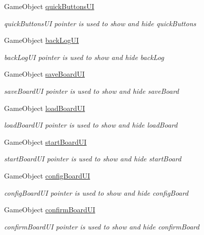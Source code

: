 \begin{DoxyCompactItemize}
Game\+Object \hyperlink{classdoki_unity_1_1_world_control_a75860dbad7622880a7423f9591c100eb}{quick\+Buttons\+UI}
\begin{DoxyCompactList}\small\item\em quick\+Buttons\+UI pointer is used to show and hide quick\+Buttons \end{DoxyCompactList}\item 
Game\+Object \hyperlink{classdoki_unity_1_1_world_control_a0a45da5cc8aca07edcb84b2b4efdb405}{back\+Log\+UI}
\begin{DoxyCompactList}\small\item\em back\+Log\+UI pointer is used to show and hide back\+Log \end{DoxyCompactList}\item 
Game\+Object \hyperlink{classdoki_unity_1_1_world_control_aa1f447bae428cf45ad3aa78221fc9af2}{save\+Board\+UI}
\begin{DoxyCompactList}\small\item\em save\+Board\+UI pointer is used to show and hide save\+Board \end{DoxyCompactList}\item 
Game\+Object \hyperlink{classdoki_unity_1_1_world_control_a1acfce34bd2ad676c0f4e8e0aaf4321b}{load\+Board\+UI}
\begin{DoxyCompactList}\small\item\em load\+Board\+UI pointer is used to show and hide load\+Board \end{DoxyCompactList}\item 
Game\+Object \hyperlink{classdoki_unity_1_1_world_control_a0749c8bf0a4cd1dc9049ffabfc14e6c9}{start\+Board\+UI}
\begin{DoxyCompactList}\small\item\em start\+Board\+UI pointer is used to show and hide start\+Board \end{DoxyCompactList}\item 
Game\+Object \hyperlink{classdoki_unity_1_1_world_control_aa5a18b41fc9213ac80284f21ab447c53}{config\+Board\+UI}
\begin{DoxyCompactList}\small\item\em config\+Board\+UI pointer is used to show and hide config\+Board \end{DoxyCompactList}\item 
Game\+Object \hyperlink{classdoki_unity_1_1_world_control_a323c9efc2a87491a2de3c1beae73d177}{confirm\+Board\+UI}
\begin{DoxyCompactList}\small\item\em confirm\+Board\+UI pointer is used to show and hide confirm\+Board \end{DoxyCompactList}\item 

\end{DoxyCompactItemize}
